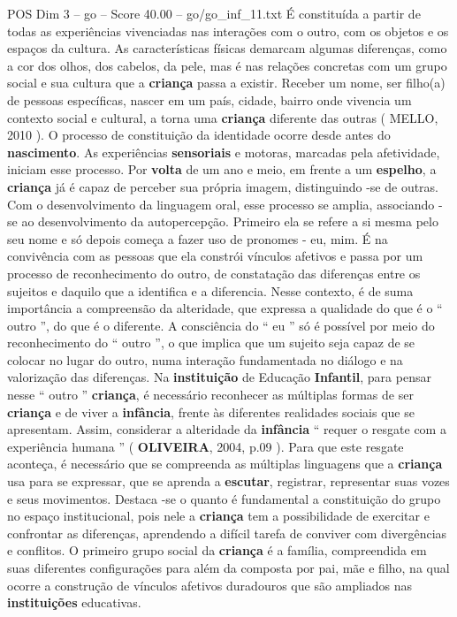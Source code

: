 \begin{textsample}{POS Dim 3 – go – Score 40.00 – go/go\_inf\_11.txt}
É constituída a partir de todas as experiências vivenciadas nas interações com o outro, com os objetos e os espaços da cultura.
As características físicas demarcam algumas diferenças, como a cor dos olhos, dos cabelos, da pele, mas é nas relações concretas com um grupo social e sua cultura que a \textbf{criança} passa a existir.
Receber um nome, ser filho(a) de pessoas específicas, nascer em um país, cidade, bairro onde vivencia um contexto social e cultural, a torna uma \textbf{criança} diferente das outras ( MELLO, 2010 ).
O processo de constituição da identidade ocorre desde antes do \textbf{nascimento}.
As experiências \textbf{sensoriais} e motoras, marcadas pela afetividade, iniciam esse processo.
Por \textbf{volta} de um ano e meio, em frente a um \textbf{espelho}, a \textbf{criança} já é capaz de perceber sua própria imagem, distinguindo -se de outras.
Com o desenvolvimento da linguagem oral, esse processo se amplia, associando -se ao desenvolvimento da autopercepção.
Primeiro ela se refere a si mesma pelo seu nome e só depois começa a fazer uso de pronomes - eu, mim.
É na convivência com as pessoas que ela constrói vínculos afetivos e passa por um processo de reconhecimento do outro, de constatação das diferenças entre os sujeitos e daquilo que a identifica e a diferencia.
Nesse contexto, é de suma importância a compreensão da alteridade, que expressa a qualidade do que é o “ outro ”, do que é o diferente.
A consciência do “ eu ” só é possível por meio do reconhecimento do “ outro ”, o que implica que um sujeito seja capaz de se colocar no lugar do outro, numa interação fundamentada no diálogo e na valorização das diferenças.
Na \textbf{instituição} de Educação \textbf{Infantil}, para pensar nesse “ outro ” \textbf{criança}, é necessário reconhecer as múltiplas formas de ser \textbf{criança} e de viver a \textbf{infância}, frente às diferentes realidades sociais que se apresentam.
Assim, considerar a alteridade da \textbf{infância} “ requer o resgate com a experiência humana ” ( \textbf{OLIVEIRA}, 2004, p.09 ).
Para que este resgate aconteça, é necessário que se compreenda as múltiplas linguagens que a \textbf{criança} usa para se expressar, que se aprenda a \textbf{escutar}, registrar, representar suas vozes e seus movimentos.
Destaca -se o quanto é fundamental a constituição do grupo no espaço institucional, pois nele a \textbf{criança} tem a possibilidade de exercitar e confrontar as diferenças, aprendendo a difícil tarefa de conviver com divergências e conflitos.
O primeiro grupo social da \textbf{criança} é a família, compreendida em suas diferentes configurações para além da composta por pai, mãe e filho, na qual ocorre a construção de vínculos afetivos duradouros que são ampliados nas \textbf{instituições} educativas.

\end{textsample}
